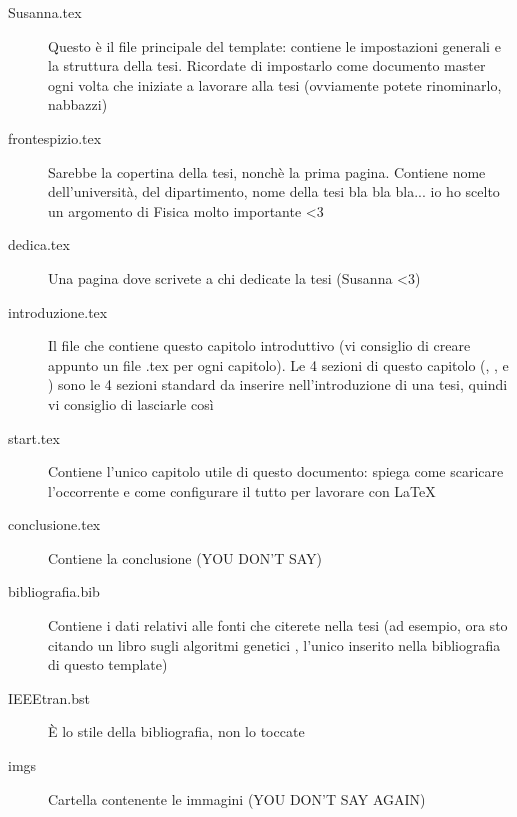 \begin{description}
  \item[Susanna.tex] Questo è il file principale del template: contiene le impostazioni generali e la struttura della tesi. Ricordate di impostarlo come documento master ogni volta che iniziate a lavorare alla tesi (ovviamente potete rinominarlo, nabbazzi)
  \item[frontespizio.tex] Sarebbe la copertina della tesi, nonchè la prima pagina. Contiene nome dell'università, del dipartimento, nome della tesi bla bla bla... io ho scelto un argomento di Fisica molto importante <3
  \item[dedica.tex] Una pagina dove scrivete a chi dedicate la tesi (Susanna <3)
  \item[introduzione.tex] Il file che contiene questo capitolo introduttivo (vi consiglio di creare appunto un file .tex per ogni capitolo). Le 4 sezioni di questo capitolo (, ,  e ) sono le 4 sezioni standard da inserire nell'introduzione di una tesi, quindi vi consiglio di lasciarle così
  \item[start.tex] Contiene l'unico capitolo utile di questo documento: spiega come scaricare l'occorrente e come configurare il tutto per lavorare con \LaTeX
  \item[conclusione.tex] Contiene la conclusione (YOU DON'T SAY)
  \item[bibliografia.bib] Contiene i dati relativi alle fonti che citerete nella tesi (ad esempio, ora sto citando un libro sugli algoritmi genetici \cite{5635176}, l'unico inserito nella bibliografia di questo template)
  \item[IEEEtran.bst] È lo stile della bibliografia, non lo toccate
  \item[imgs] Cartella contenente le immagini (YOU DON'T SAY AGAIN)
\end{description}

